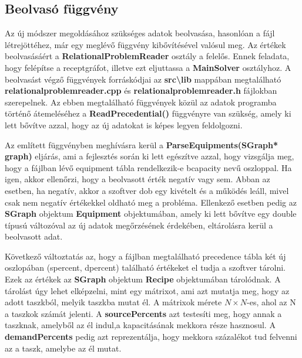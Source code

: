 \subsection{Beolvasó függvény}
Az új módszer megoldásához szükséges adatok beolvasása, hasonlóan a fájl létrejöttéhez, már egy meglévő függvény kibővítésével valósul meg. Az értékek beolvasásáért a \textbf{RelationalProblemReader} osztály a felelős. Ennek feladata, hogy felépítse a receptgráfot, illetve ezt eljuttassa a \textbf{MainSolver} osztályhoz. A beolvasást végző függvények forráskódjai az \textbf{src\textbackslash lib} mappában megtalálható \textbf{relationalproblemreader.cpp} és \textbf{relationalproblemreader.h} fájlokban szerepelnek. Az ebben megtalálható függvények közül az adatok programba történő átemeléséhez a \textbf{ReadPrecedential()} függvényre van szükség, amely ki lett bővítve azzal, hogy az új adatokat is képes legyen feldolgozni. 

Az említett függvényben meghívásra kerül a \textbf{ParseEquipments(SGraph* graph)} eljárás, ami a fejlesztés során ki lett egészítve azzal, hogy vizsgálja meg, hogy a fájlban lévő equipment tábla rendelkezik-e b\textunderscore capacity nevű oszloppal.
Ha igen, akkor ellenőrzi, hogy a beolvasott érték negatív vagy sem. Abban az esetben, ha negatív, akkor a szoftver dob egy kivételt és a működés leáll, mivel csak nem negatív értékekkel oldható meg a probléma. Ellenkező esetben pedig az \textbf{SGraph} objektum \textbf{Equipment} objektumában, amely ki lett bővítve egy double típusú változóval az új adatok megőrzésének érdekében, eltárolásra kerül a beolvasott adat.

Következő változtatás az, hogy a fájlban megtalálható precedence tábla két új oszlopában (s\textunderscore percent, d\textunderscore percent) található értékeket el tudja a szoftver tárolni. Ezek az értékek az \textbf{SGraph} objektum \textbf{Recipe} objektumában tárolódnak. A tárolást úgy lehet elképzelni, mint egy mátrixot, ami azt mutatja meg, hogy az adott taszkból, melyik taszkba mutat él. A mátrixok mérete $N\times N$-es, ahol az N a taszkok számát jelenti. A \textbf{sourcePercents} azt testesíti meg, hogy annak a taszknak, amelyből az él indul,a kapacitásának mekkora része hasznosul. A \textbf{demandPercents} pedig azt reprezentálja, hogy mekkora százalékot tud felvenni az a taszk, amelybe az él mutat.

